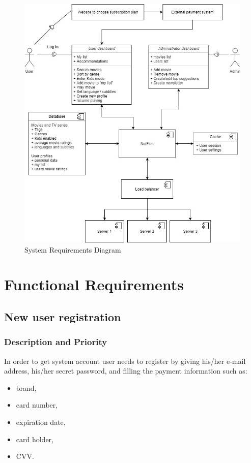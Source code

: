 \documentclass{scrreprt}
\begin{document}
\begin{figure}[hp]
  \centering
  \includegraphics[width=1\textwidth]{img/sysml.jpg}
  \caption{System Requirements Diagram}
  \label{fig:SysML}
\end{figure}


\chapter{Functional Requirements}

\section{New user registration}

\subsection{Description and Priority}

In order to get system account user needs to register by giving his/her e-mail address, his/her secret password, and filling the payment information such as: 
\begin{itemize}
\item brand,
\item card number,
\item expiration date,
\item card holder,
\item CVV.
\end{itemize}
\end{document}
